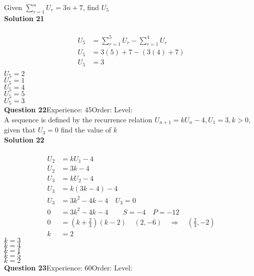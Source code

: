 \documentclass{article}
\begin{document}
Given $\displaystyle\sum_{r=1}^{n} U_r = 3n+7$, find $U_5$\\[4pt]
\noindent\textbf{Solution 21}\\[2pt]
\\[-10pt]\begin{align*}
U_5&=\displaystyle\sum_{r=1}^{5} U_r - \displaystyle\sum_{r=1}^{4} U_r\\[2pt]
U_5&=3(5)+7 - (3(4)+7)\\[2pt]
U_5&=3\\
\end{align*}
$U_5=2$\\
$U_5=1$\\
$U_5=4$\\
$U_5=5$\\
$U_5=3$\\
\noindent\textbf{Question 22}\hspace{20pt}Experience: 45\hspace{20pt}Order: \hspace{20pt}Level: \\[2pt]
A sequence is defined by the recurrence relation $U_{n+1}=kU_n-4, U_1=3, k>0$, given that $U_3=0$ find the value of $k$\\[4pt]
\noindent\textbf{Solution 22}\\[2pt]
\\[-10pt]\begin{align*}
U_2&=kU_1-4\\[2pt]
U_2&=3k-4\\[12pt]
U_3&=kU_2-4\\[2pt]
U_3&=k(3k-4)-4\\[2pt]
U_3&=3k^2-4k-4\quad U_3=0\\[12pt]
0&=3k^2-4k-4\hspace{25pt}S=-4\quad P=-12\\[2pt]
0&=\left(k+\frac{2}{3}\right)(k-2) \hspace{13pt}(2,-6) \quad \Rightarrow \quad \left(\displaystyle\frac{2}{3},-2\right)\\[2pt]
k&=2
\end{align*}
$k=3$\\
$k=4$\\
$k=1$\\
$k=5$\\
$k=2$\\
\noindent\textbf{Question 23}\hspace{20pt}Experience: 60\hspace{20pt}Order: \hspace{20pt}Level: \\[2pt]
\end{document}
